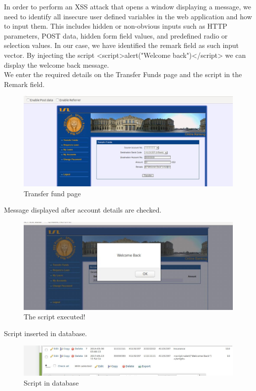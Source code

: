 \documentclass[12pt]{report}
\begin{document}
	In order to perform an XSS attack that opens a window displaying a message, we need to identify all insecure user defined variables in the web application and how to input them. This includes hidden or non-obvious inputs such as HTTP parameters, POST data, hidden form field values, and predefined radio or selection values.  In our case, we have identified the remark field as such input vector. By injecting the script <script>alert("Welcome back")</script> we can display the welcome back message.\\
	We enter the required details on the Transfer Funds page and the script in the Remark field.
	\begin{figure}[H]
		\includegraphics[width=0.75\textheight]{images/2_2transferfund.jpg}
		\caption{Transfer fund page}
		
	\end{figure}
	Message displayed after account details are checked.
	\begin{figure}[H]
		\includegraphics[width=0.75\textheight]{images/2_2welcomeback.jpg}
		\caption{The script executed!}
		
	\end{figure}
	Script inserted in database.
	\begin{figure}[H]
		\includegraphics[width=0.75\textheight]{images/2_2databasescript.jpg}
		\caption{Script in database}
		
	\end{figure}
	
\end{document}
